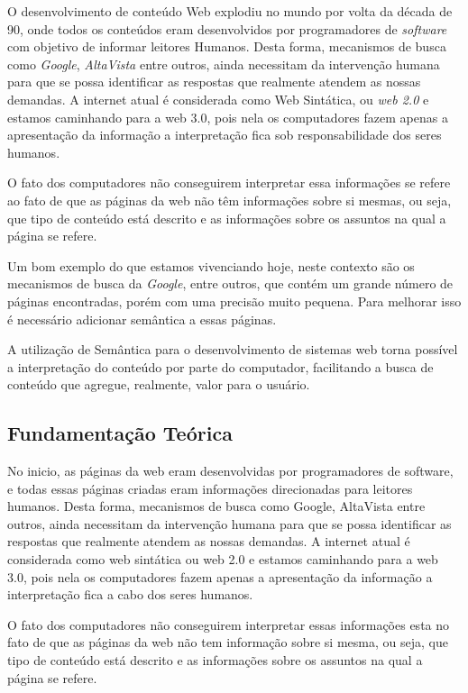 
O desenvolvimento de conteúdo Web explodiu no mundo por volta da década de 90, onde todos os conteúdos eram desenvolvidos por programadores de \textit{software} com objetivo de informar leitores Humanos. Desta forma, mecanismos de busca como \textit{Google}, \textit{AltaVista} entre outros, ainda necessitam da intervenção humana para que se possa identificar as respostas que realmente atendem as nossas demandas. A internet atual é considerada como Web Sintática, ou \textit{web 2.0} e estamos caminhando para a web 3.0, pois nela os computadores fazem apenas a apresentação da informação a interpretação fica sob responsabilidade dos seres humanos.

O fato dos computadores não conseguirem interpretar essa informações se refere ao fato de que as páginas da web não têm informações sobre si mesmas, ou seja, que tipo de conteúdo está descrito e as informações sobre os assuntos na qual a página se refere.

Um bom exemplo do que estamos vivenciando hoje, neste contexto são os mecanismos de busca da \textit{Google}, entre outros, que contém um grande número de páginas encontradas, porém com uma precisão muito pequena. Para melhorar isso é necessário adicionar semântica a essas páginas.

A utilização de Semântica para o desenvolvimento de sistemas web torna possível a interpretação do conteúdo por parte do computador, facilitando a busca de conteúdo que agregue, realmente, valor para o usuário.


\subsection{Fundamentação Teórica}

No inicio, as páginas da web eram desenvolvidas por programadores de software, e todas essas páginas criadas eram informações direcionadas para leitores humanos. Desta forma, mecanismos de busca como Google, AltaVista entre outros, ainda necessitam da intervenção humana para que se possa identificar as respostas que realmente atendem as nossas demandas. A internet atual é considerada como web sintática ou web 2.0 e estamos caminhando para a web 3.0, pois nela os computadores fazem apenas a apresentação da informação a interpretação fica a cabo dos seres humanos.

O fato dos computadores não conseguirem interpretar essas informações esta no fato de que as páginas da web não tem informação sobre si mesma, ou seja, que tipo de conteúdo está descrito e as informações sobre os assuntos na qual a página se refere.

